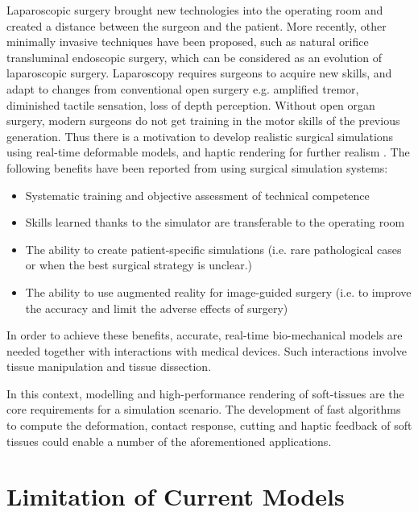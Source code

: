 Laparoscopic surgery brought new technologies into the operating room and created a 
distance between the surgeon and the patient. More recently, other minimally invasive techniques have 
been proposed, such as natural orifice transluminal endoscopic surgery, which can be considered as an 
evolution of laparoscopic surgery. Laparoscopy requires surgeons to acquire new skills, and adapt 
to changes from conventional open surgery e.g. amplified tremor, diminished tactile sensation, loss of 
depth perception.  Without open organ surgery, modern surgeons do not get 
training in the motor skills of the previous generation. Thus there is a 
motivation to develop realistic surgical simulations using 
real-time deformable models, and haptic rendering for further realism \cite{Lin2004}. 
The following benefits have been reported from 
using surgical simulation systems:  \cite{}

\begin{itemize}
 \item Systematic training and objective assessment of technical competence
 \item Skills learned thanks to the simulator are transferable to the operating room
 \item The ability to create patient-specific simulations (i.e. rare pathological cases or when the best surgical strategy is unclear.)
 \item The ability to use augmented reality for image-guided surgery (i.e. to improve the accuracy and limit the adverse effects of surgery)
\end{itemize}

In order to achieve these benefits, accurate, real-time bio-mechanical models are needed together
with interactions with medical devices. Such interactions involve tissue manipulation and tissue dissection. 

In this context, modelling and high-performance rendering of soft-tissues are the core requirements for 
a simulation scenario. The development of fast algorithms to compute the deformation, contact response, 
cutting and haptic feedback of soft tissues could enable a number of the aforementioned applications.


\section{Limitation of Current Models}
\label{sec:limitationsOfCurrentModels}


